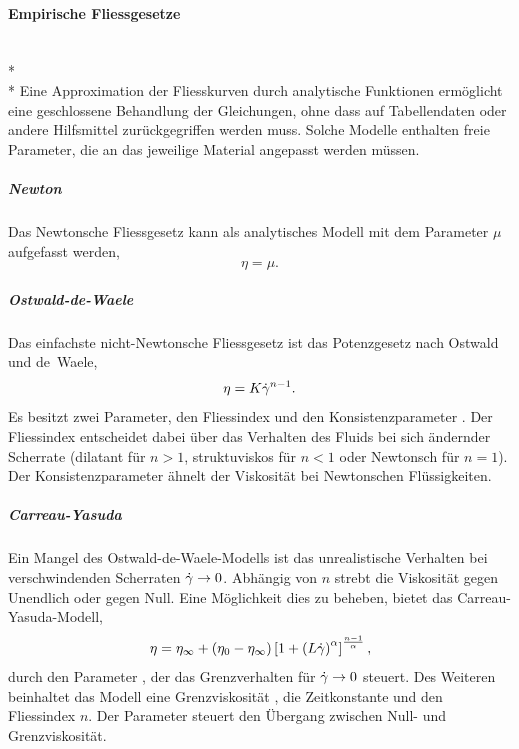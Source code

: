 \paragraph{Empirische Fliessgesetze}~\\*~\\*
Eine Approximation der Fliesskurven durch analytische Funktionen er\-mög\-licht eine geschlossene Behandlung der Gleichungen, ohne dass auf Tabellendaten oder andere Hilfsmittel zurückgegriffen werden muss.
Solche Modelle enthalten freie Parameter, die an das jeweilige Material angepasst werden müssen.
%
\subparagraph{Newton}
Das Newtonsche Fliessgesetz kann als analytisches Modell mit dem Parameter $\mu$ aufgefasst werden,
\begin{equation}
    \eta = \mu.
    \label{eq:fg:newton}
\end{equation}
%
\subparagraph{Ostwald-de-Waele}
Das einfachste nicht-Newtonsche Fliessgesetz ist das Potenzgesetz nach Ostwald und de~Waele,
\begin{equation}
    \eta=K\dot\gamma^{n-1}.
    \label{eq:fg:potenz}
\end{equation}
Es besitzt zwei Parameter, den Fliessindex  und den Konsistenzparameter . Der Fliessindex entscheidet dabei über das Verhalten des Fluids bei sich ändernder Scherrate (dilatant für $n>1$, struktuviskos für $n<1$ oder Newtonsch für $n=1$). Der Konsistenzparameter ähnelt der Viskosität bei Newtonschen Flüssigkeiten.
%
\subparagraph{Carreau-Yasuda}
Ein Mangel des Ostwald-de-Waele-Modells ist das unrealistische Verhalten bei verschwindenden Scherraten $\dot\gamma\rightarrow 0$. Abhängig von $n$ strebt die Viskosität gegen Unendlich oder gegen Null.
Eine Möglichkeit dies zu beheben, bietet das Carreau-Yasuda-Modell,
\begin{equation}
    \eta=\eta_\infty+\left( \eta_0-\eta_\infty \right)\left[ 1+\left( L\dot\gamma \right)^\alpha \right] ^{\frac{n-1}{\alpha}},
    \label{eq:fg:carreauyasuda}
\end{equation}
durch den Parameter , der das Grenzverhalten für $\dot\gamma\rightarrow0$ steuert. Des Weiteren beinhaltet das Modell eine Grenzviskosität , die Zeitkonstante  und den Fliessindex $n$. Der Parameter  steuert den Übergang zwischen Null- und Grenzviskosität.
